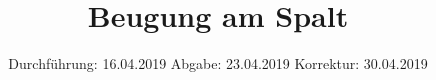 

\subject{V406}
\title{Beugung am Spalt}
\date{
  Durchführung: 16.04.2019
  \hspace{3em}
  Abgabe: 23.04.2019
  Korrektur: 30.04.2019
}


\maketitle
\thispagestyle{empty}
\tableofcontents
\newpage








\printbibliography

